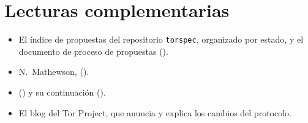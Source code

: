 \section*{Lecturas complementarias}
\begin{itemize}
  \item El índice de propuestas del repositorio \texttt{torspec}, organizado por estado, y el documento de proceso de propuestas ().
  \item N.~Mathewson,  ().
  \item {} () y su continuación ().
  \item El blog del Tor Project, que anuncia y explica los cambios del protocolo.
\end{itemize}
